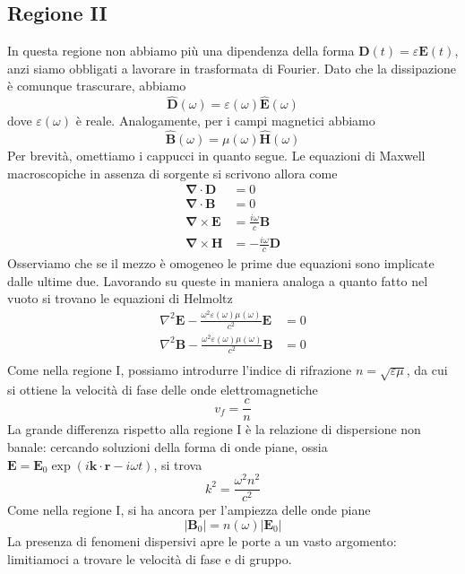 \documentclass[a4paper,11pt]{book}
\let\oldnabla\nabla
\renewcommand{\nabla}{\vec{\oldnabla}}
\newcommand{\lap}{\oldnabla^2}
\renewcommand{\vec}[1]{\mathbf{#1}}
\theoremstyle{theorem}
\theoremstyle{definition}
\begin{document}
\subsection{Regione II}
In questa regione non abbiamo più una dipendenza della forma $\vec{D}(t)=\varepsilon\vec{E}(t)$, anzi siamo obbligati a lavorare in trasformata di Fourier. Dato che la dissipazione è comunque trascurare, abbiamo
\[\hat{\vec{D}}(\omega)=\varepsilon(\omega)\hat{\vec{E}}(\omega)\]
dove $\varepsilon(\omega)$ è reale. Analogamente, per i campi magnetici abbiamo
\[\hat{\vec{B}}(\omega)=\mu(\omega)\hat{\vec{H}}(\omega)\]
Per brevità, omettiamo i cappucci in quanto segue. Le equazioni di Maxwell macroscopiche in assenza di sorgente si scrivono allora come
\begin{align*}
	\nabla\cdot\vec{D}&=0\\\nabla\cdot\vec{B}&=0\\\nabla\times\vec{E}&=\frac{i\omega}{c}\vec{B}\\\nabla\times\vec{H}&=-\frac{i\omega}{c}\vec{D}
\end{align*}
Osserviamo che se il mezzo è omogeneo le prime due equazioni sono implicate dalle ultime due. Lavorando su queste in maniera analoga a quanto fatto nel vuoto si trovano le equazioni di Helmoltz
\begin{align*}
	\lap\vec{E}-\frac{\omega^2\varepsilon(\omega)\mu(\omega)}{c^2}\vec{E}&=0\\
	\lap\vec{B}-\frac{\omega^2\varepsilon(\omega)\mu(\omega)}{c^2}\vec{B}&=0\\
\end{align*}
Come nella regione I, possiamo introdurre l'indice di rifrazione $n=\sqrt{\varepsilon\mu}$, da cui si ottiene la velocità di fase delle onde elettromagnetiche
\[v_f=\frac{c}{n}\]
La grande differenza rispetto alla regione I è la relazione di dispersione non banale: cercando soluzioni della forma di onde piane, ossia $\vec{E}=\vec{E}_0\exp(i\vec{k}\cdot\vec{r}-i\omega t)$, si trova
\[k^2=\frac{\omega^2n^2}{c^2}\]
Come nella regione I, si ha ancora per l'ampiezza delle onde piane
\[|\vec{B}_0|=n(\omega)|\vec{E}_0|\]
La presenza di fenomeni dispersivi apre le porte a un vasto argomento: limitiamoci a trovare le velocità di fase e di gruppo.
\end{document}

